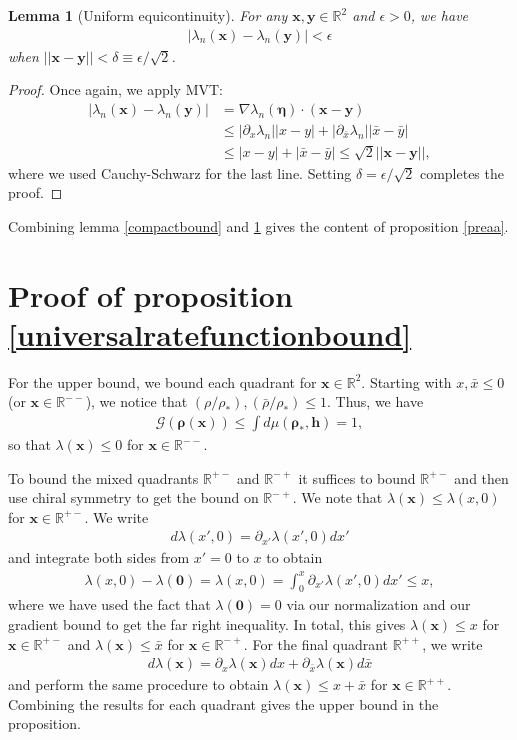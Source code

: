 \documentclass[a4paper,11pt]{article}
\theoremstyle{plain}
\newtheorem{lem}[thm]{Lemma}
\theoremstyle{definition}
\theoremstyle{remark}
\newcommand{\bs}[1]{\boldsymbol{#1}}
\newcommand{\rhob}{{\bar{\rho}}}
\newcommand{\ba}{\begin{equation} \begin{aligned}}
\newcommand{\ea}{\end{aligned} \end{equation}}
\begin{document}
\begin{appendix}
\begin{lem}[Uniform equicontinuity] \label{uniformequi}
For any $\bs{x},\bs{y} \in \mathbb{R}^2$ and $\epsilon > 0$, we have
\ba
|\lambda_n(\bs{x}) - \lambda_n(\bs{y})|  < \epsilon
\ea
when $||\bs{x} - \bs{y}|| < \delta \equiv \epsilon /\sqrt{2} $.
\end{lem}
\begin{proof}
Once again, we apply MVT:
\ba
|\lambda_n(\bs{x}) - \lambda_n(\bs{y})|  &= \nabla\lambda_n(\bs{\eta})\cdot(\bs{x}-\bs{y})\\
&\leq |\partial_x \lambda_n| |x-y| + |\partial_{\bar{x}}\lambda_n| | \bar{x} - \bar{y}|\\
& \leq |x-y| + |\bar{x}-\bar{y}| \leq \sqrt{2} || \bs{x}-\bs{y}||,
\ea
where we used Cauchy-Schwarz for the last line. Setting $\delta = \epsilon / \sqrt{2}$ completes the proof.
\end{proof}
Combining lemma \ref{compactbound} and \ref{uniformequi} gives the content of proposition \ref{preaa}.


\section{Proof of proposition \ref{universalratefunctionbound}}
\label{proofofuniversalratefuncbound}

For the upper bound, we bound each quadrant for $\bs{x} \in \mathbb{R}^2$. Starting with $x,\bar{x} \leq0$ (or $\bs{x} \in \mathbb{R}^{--}$), we notice that $(\rho/\rho_*), (\rhob/\rho_*) \leq 1$. Thus, we have
\ba
\mathcal{G}(\bs{\rho}(\bs{x})) \leq \int d\mu(\bs{\rho}_*,\bs{h}) =1,
\ea
so that $\lambda(\bs{x}) \leq 0$ for $\bs{x} \in \mathbb{R}^{--}$.

To bound the mixed quadrants $\mathbb{R}^{+-}$ and $\mathbb{R}^{-+}$ it suffices to bound $\mathbb{R}^{+-}$ and then use chiral symmetry to get the bound on $\mathbb{R}^{-+}$. We note that $\lambda(\bs{x}) \leq \lambda( x,0)$ for $\bs{x} \in\mathbb{R}^{+-}$. We write
\ba
d\lambda(x',0) = \partial_{x'}\lambda(x',0) dx'
\ea
and integrate both sides from $x' =0$ to $x$ to obtain
\ba
\lambda(x,0) - \lambda(\bs{0}) = \lambda(x,0) = \int_0^x\partial_{x'}\lambda(x',0) dx' \leq x,
\ea
where we have used the fact that $\lambda(\bs{0}) =0$ via our normalization and our gradient bound to get the far right inequality. In total, this gives $\lambda(\bs{x}) \leq x$ for $\bs{x} \in \mathbb{R}^{+-}$ and $\lambda(\bs{x}) \leq \bar{x}$ for $\bs{x} \in \mathbb{R}^{-+}$. For the final quadrant $\mathbb{R}^{++}$, we write
\ba
d\lambda(\bs{x}) = \partial_x \lambda(\bs{x}) dx +  \partial_{\bar{x}} \lambda(\bs{x}) d\bar{x}
\ea
and perform the same procedure to obtain $\lambda(\bs{x}) \leq x+\bar{x}$ for $\bs{x} \in \mathbb{R}^{++}$. Combining the results for each quadrant gives the upper bound in the proposition.


\end{appendix}
\end{document}

